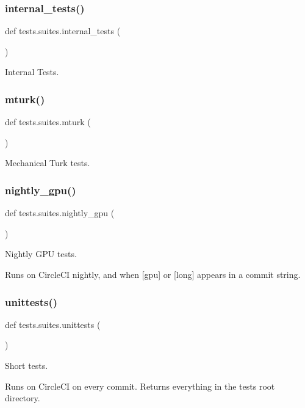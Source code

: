 \subsubsection{\texorpdfstring{internal\+\_\+tests()}{internal\_tests()}}
{\footnotesize\ttfamily def tests.\+suites.\+internal\+\_\+tests (\begin{DoxyParamCaption}{ }\end{DoxyParamCaption})}

\begin{DoxyVerb}Internal Tests.
\end{DoxyVerb}
 \mbox{\label{namespacetests_1_1suites_a5d5a0bb14f72dd9c86a97cc6ca6add87}} 
\subsubsection{\texorpdfstring{mturk()}{mturk()}}
{\footnotesize\ttfamily def tests.\+suites.\+mturk (\begin{DoxyParamCaption}{ }\end{DoxyParamCaption})}

\begin{DoxyVerb}Mechanical Turk tests.
\end{DoxyVerb}
 \mbox{\label{namespacetests_1_1suites_ab1df665f54fccb5bbceb95cf8e4498b9}} 
\subsubsection{\texorpdfstring{nightly\+\_\+gpu()}{nightly\_gpu()}}
{\footnotesize\ttfamily def tests.\+suites.\+nightly\+\_\+gpu (\begin{DoxyParamCaption}{ }\end{DoxyParamCaption})}

\begin{DoxyVerb}Nightly GPU tests.

Runs on CircleCI nightly, and when [gpu] or [long] appears in a commit string.
\end{DoxyVerb}
 \mbox{\label{namespacetests_1_1suites_a02a7d577493ceb024319292b96e13265}} 
\subsubsection{\texorpdfstring{unittests()}{unittests()}}
{\footnotesize\ttfamily def tests.\+suites.\+unittests (\begin{DoxyParamCaption}{ }\end{DoxyParamCaption})}

\begin{DoxyVerb}Short tests.

Runs on CircleCI on every commit. Returns everything in the tests root directory.
\end{DoxyVerb}
 